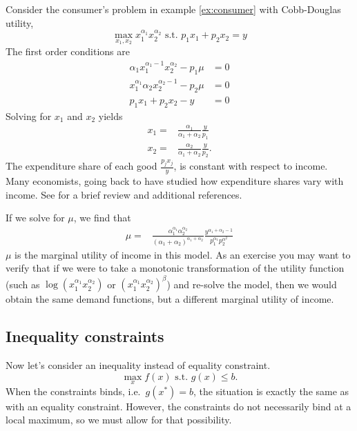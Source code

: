 \begin{example}
  Consider the consumer's problem in example \ref{ex:consumer} with
  Cobb-Douglas utility,
  \[ \max_{x_1,x_2} x_1^{\alpha_1} x_2^{\alpha_2} \text{ s.t. } p_1 x_1 + p_2
  x_2 = y \]
  The first order conditions are
  \begin{align*}
    \alpha_1 x_1^{\alpha_1 -1} x_2^{\alpha_2}- p_1 \mu & = 0 \\
    x_1^{\alpha_1} \alpha_2 x_2^{\alpha_2-1} - p_2 \mu & = 0  \\
    p_1 x_1 + p_2 x_2 - y & = 0
  \end{align*}
  Solving for $x_1$ and $x_2$ yields 
  \begin{align*}
    x_1 = & \frac{\alpha_1}{\alpha_1 + \alpha_2} \frac{y}{p_1} \\
    x_2 = & \frac{\alpha_2}{\alpha_1 + \alpha_2} \frac{y}{p_2}.
  \end{align*}
  The expenditure share of each good $\frac{p_j x_j}{y}$, is constant
  with respect to income. Many economists, going back to
  \cite{engel1857} have studied how expenditure shares vary with
  income. See \cite{lewbel2008} for a brief review and additional
  references. 

  If we solve for $\mu$, we find that 
  \begin{align*}
    \mu = & \frac{\alpha_1^{\alpha_1} \alpha_2^{\alpha_2}}
    {(\alpha_1 + \alpha_2)^{\alpha_1+\alpha_2}}
    \frac{y^{\alpha_1+\alpha_2 -1}} {p_1^{\alpha_1} p_2^{\alpha^2} }
  \end{align*}
  $\mu$ is the marginal utility of income in this model. As an
  exercise you may want to verify that if we were to take a monotonic
  transformation of the utility function (such as $\log(x_1^{\alpha_1}
  x_2^{\alpha_2})$ or $(x_1^{\alpha_1} x_2^{\alpha_2})^\beta$) and
  re-solve the model, then we would obtain the same demand functions,
  but a different marginal utility of income. 
\end{example}

\subsection{Inequality constraints}

Now let's consider an inequality instead of equality constraint. 
\[ \max_{x} f(x) \text{ s.t. } g(x) \leq b. \]
When the constraints binds, i.e.\ $g(x^*) = b$, the situation is
exactly the same as with an equality constraint. However, the
constraints do not necessarily bind at a local maximum, so we must
allow for that possibility.

